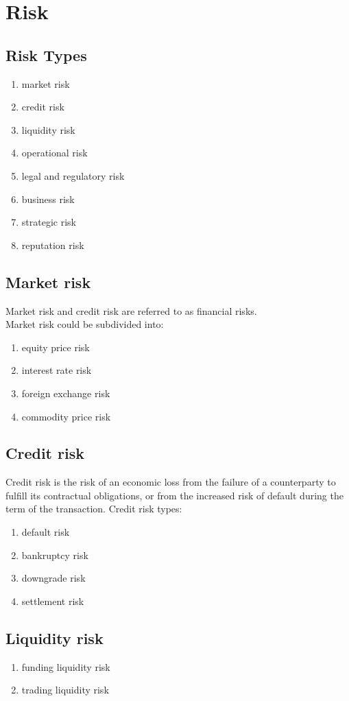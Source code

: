 \chapter{Risk}

\section{Risk Types}

\begin{enumerate}
	\item market risk
	\item credit risk
	\item liquidity risk
	\item operational risk
	\item legal and regulatory risk
	\item business risk
	\item strategic risk
	\item reputation risk
\end{enumerate}

\section{Market risk}

Market risk and credit risk are referred to as financial risks.\\
Market risk could be subdivided into:
\begin{enumerate}
	\item equity price risk
	\item interest rate risk
	\item foreign exchange risk
	\item commodity price risk 
\end{enumerate}

\section{Credit risk}

Credit risk is the risk of an economic loss from the failure of a counterparty to fulfill its contractual obligations, or from the increased risk of default during the term of the transaction.
Credit risk types:
\begin{enumerate}
	\item default risk
	\item bankruptcy risk
	\item downgrade risk
	\item settlement risk
\end{enumerate}

\section{Liquidity risk}

\begin{enumerate}
	\item funding liquidity risk
	\item trading liquidity risk
\end{enumerate}

